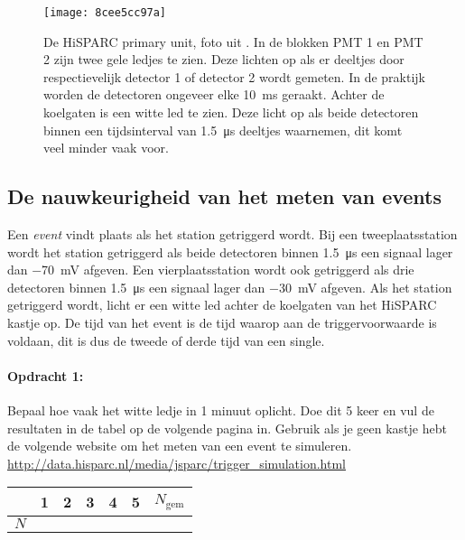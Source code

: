 \begin{figure}[ht]
    \centering
    \texttt{[image: 8cee5cc97a]}
    \caption{De HiSPARC primary unit, foto uit \cite{nikhefhisparc}. In de
             blokken PMT 1 en PMT 2 zijn twee gele ledjes te zien. Deze
             lichten op als er deeltjes door respectievelijk detector 1
             of detector 2 wordt gemeten. In de praktijk worden de
             detectoren ongeveer elke \SI{10}{\milli\second} geraakt.
             Achter de koelgaten is een witte led te zien. Deze licht op
             als beide detectoren binnen een tijdsinterval van
             \SI{1.5}{\micro\second} deeltjes waarnemen, dit komt veel
             minder vaak voor.}
\end{figure}


\subsection{De nauwkeurigheid van het meten van events}

Een \emph{event} vindt plaats als het station getriggerd wordt.
Bij een tweeplaatsstation wordt het station getriggerd als beide detectoren
binnen \SI{1,5}{\micro\second} een signaal lager dan \SI{-70}{\milli\volt}
afgeven. Een vierplaatsstation wordt ook getriggerd als drie detectoren
binnen \SI{1,5}{\micro\second} een signaal lager dan \SI{-30}{\milli\volt}
afgeven. Als het station getriggerd wordt, licht er een witte led
achter de koelgaten van het HiSPARC kastje op. De tijd van het event
is de tijd waarop aan de triggervoorwaarde is voldaan, dit is dus
de tweede of derde tijd van een single.

\begin{minipage}[t]{1\columnwidth}%

\paragraph{Opdracht 1:}

Bepaal hoe vaak het witte ledje in 1 minuut oplicht. Doe dit 5 keer
en vul de resultaten in de tabel op de volgende pagina in.
Gebruik als je geen \hisparc kastje hebt de volgende website om het
meten van een event te simuleren.\\
\url{http://data.hisparc.nl/media/jsparc/trigger_simulation.html}


\vspace{1em}
\begin{tabular}{|x{.11\textwidth}|x{.11\textwidth}|x{.11\textwidth}
                |x{.11\textwidth}|x{.11\textwidth}|x{.11\textwidth}
                |x{.11\textwidth}|}
     & 1 & 2 & 3 & 4 & 5 & $N_\textrm{gem}$\\
    \hline
    $N$ &  &  &  &  &  & \tabularnewline
    \hline
\end{tabular}%
\end{minipage}

